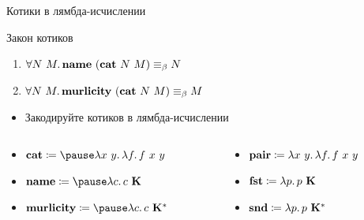     \begin{frame}{Котики в лямбда-исчислении}
        \vspace{-0.5em}
        \begin{block}{Закон котиков}
            \begin{enumerate}
                \item $\forall N~M\ldotp \mathbf{name}~(\mathbf{cat}~N~M) \equiv_\beta N$
                \item $\forall N~M\ldotp \mathbf{murlicity}~(\mathbf{cat}~N~M) \equiv_\beta M$
            \end{enumerate}
        \end{block}
        \begin{itemize}
            \item[\todo] Закодируйте котиков в лямбда-исчислении
        \end{itemize}
        \vspace{-1em}
        \begin{columns}[onlytextwidth]
            \begin{column}[t]{0.485\textwidth}
                \begin{itemize}
                    \item$\term{cat} \termdef \pause \lambda x~y\ldotp \lambda f \ldotp f \ap x \ap y$
                    \item $\term{name} \termdef \pause \lambda c \ldotp c \ap \term{K}$
                    \item $\term{murlicity} \termdef \pause \lambda c \ldotp c \ap \term{K}^*$
                \end{itemize}
            \end{column}\hfill
            \pause%
            \begin{column}[t]{0.485\textwidth}
                \begin{itemize}
                    \item $\mathbf{pair} \coloneqq \lambda x~y\ldotp \lambda f \ldotp f ~ x ~ y$
                    \item $\mathbf{fst} \coloneqq \lambda p \ldotp p ~ \mathbf{K}$
                    \item $\mathbf{snd} \coloneqq \lambda p \ldotp p ~ \mathbf{K}^*$
                \end{itemize}
            \end{column}
        \end{columns}
    \end{frame}

